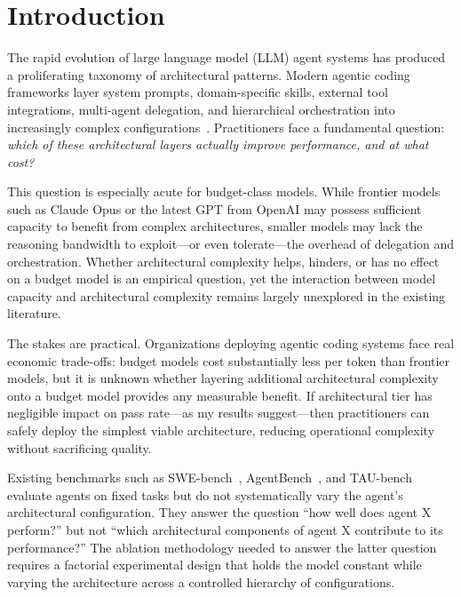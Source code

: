 \documentclass[11pt]{article}
\begin{document}
\section{Introduction}
\label{sec:introduction}

The rapid evolution of large language model (LLM) agent systems has produced a
proliferating taxonomy of architectural patterns. Modern agentic coding
frameworks layer system prompts, domain-specific skills, external tool
integrations, multi-agent delegation, and hierarchical orchestration into
increasingly complex configurations~\cite{anthropic2024claude, liu2023agentbench}.
Practitioners face a fundamental question: \emph{which of these architectural
layers actually improve performance, and at what cost?}

This question is especially acute for budget-class models. While frontier
models such as Claude Opus or the latest GPT from OpenAI may possess sufficient capacity to benefit
from complex architectures, smaller models may lack the reasoning bandwidth to
exploit---or even tolerate---the overhead of delegation and orchestration.
Whether architectural complexity helps, hinders, or has no effect on a budget
model is an empirical question, yet the interaction between model capacity and
architectural complexity remains largely unexplored in the existing literature.

The stakes are practical. Organizations deploying agentic coding systems face
real economic trade-offs: budget models cost substantially less per token than
frontier models, but it is unknown whether layering additional architectural
complexity onto a budget model provides any measurable benefit. If
architectural tier has negligible impact on pass rate---as my results
suggest---then practitioners can safely deploy the simplest viable
architecture, reducing operational complexity without sacrificing quality.

Existing benchmarks such as SWE-bench~\cite{jimenez2024swebench},
AgentBench~\cite{liu2023agentbench}, and TAU-bench~\cite{yao2024taubench}
evaluate agents on fixed tasks but do not systematically vary the agent's
architectural configuration. They answer the question ``how well does agent X
perform?'' but not ``which architectural components of agent X contribute to
its performance?'' The ablation methodology needed to answer the latter
question requires a factorial experimental design that holds the model constant
while varying the architecture across a controlled hierarchy of configurations.
\end{document}
